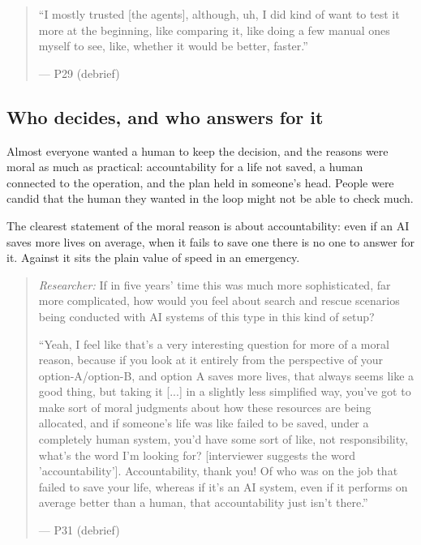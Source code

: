 \begin{quote}\small
``I mostly trusted [the agents], although, uh, I did kind of want to test it more at the beginning, like comparing it, like doing a few manual ones myself to see, like, whether it would be better, faster.''\par\hfill--- P29 (debrief)
\end{quote}

\clearpage



\subsection{Who decides, and who answers for it}\label{sec:qual:who-decides}

Almost everyone wanted a human to keep the decision, and the reasons were moral as much as practical: accountability for a life not saved, a human connected to the operation, and the plan held in someone's head. People were candid that the human they wanted in the loop might not be able to check much.


\label{sec:qual:who-decides:accountability}
The clearest statement of the moral reason is about accountability: even if an AI saves more lives on average, when it fails to save one there is no one to answer for it. Against it sits the plain value of speed in an emergency.

\begin{quote}\small
{\footnotesize\textit{Researcher:} If in five years' time this was much more sophisticated, far more complicated, how would you feel about search and rescue scenarios being conducted with AI systems of this type in this kind of setup?}\par\smallskip
``Yeah, I feel like that's a very interesting question for more of a moral reason, because if you look at it entirely from the perspective of your option-A/option-B, and option A saves more lives, that always seems like a good thing, but taking it [...] in a slightly less simplified way, you've got to make sort of moral judgments about how these resources are being allocated, and if someone's life was like failed to be saved, under a completely human system, you'd have some sort of like, not responsibility, what's the word I'm looking for? [interviewer suggests the word 'accountability']. Accountability, thank you! Of who was on the job that failed to save your life, whereas if it's an AI system, even if it performs on average better than a human, that accountability just isn't there.''\par\hfill--- P31 (debrief)
\end{quote}

